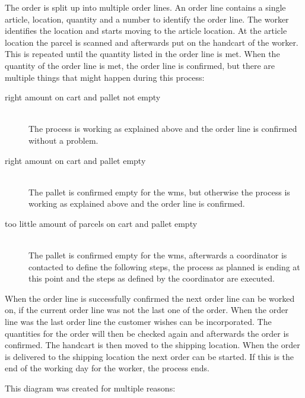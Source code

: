The order is split up into multiple order lines. An order line contains a single article, location, quantity and a number to identify the order line. The worker identifies the location and starts moving to the article location. At the article location the parcel is scanned and afterwards put on the handcart of the worker. This is repeated until the quantity listed in the order line is met. When the quantity of the order line is met, the order line is confirmed, but there are multiple things that might happen during this process:

\begin{description}
	\item[right amount on cart and pallet not empty] \hfill \\
	The process is working as explained above and the order line is confirmed without a problem.
	\item[right amount on cart and pallet empty] \hfill \\
	The pallet is confirmed empty for the \gls{wms}, but otherwise the process is working as explained above and the order line is confirmed.
	\item[too little amount of parcels on cart and pallet empty] \hfill \\
	The pallet is confirmed empty for the \gls{wms}, afterwards a coordinator is contacted to define the following steps, the process as planned is ending at this point and the steps as defined by the coordinator are executed.
\end{description}

When the order line is successfully confirmed the next order line can be worked on, if the current order line was not the last one of the order. When the order line was the last order line the customer wishes can be incorporated. The quantities for the order will then be checked again and afterwards the order is confirmed. The handcart is then moved to the shipping location. When the order is delivered to the shipping location the next order can be started. If this is the end of the working day for the worker, the process ends.


This diagram was created for multiple reasons:


